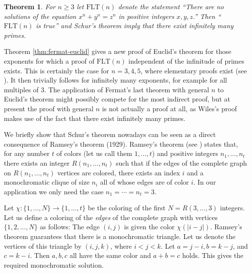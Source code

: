 \documentclass{article}
\theoremstyle{theorem}
\newtheorem{theorem}{Theorem}
\theoremstyle{definition}
\newcommand{\FLT}{\mathrm{FLT}}
\begin{document}
\begin{theorem}{\label{thm:fermat-euclid}}
For $n \geq 3$ let $\FLT(n)$ denote the statement
``There are no solutions of the equation 
$x^n+y^n=z^n$ in positive integers $x,y,z$.''
Then ``$\FLT(n)$ is true'' and Schur's theorem imply that
there exist infinitely many primes.
\end{theorem}
Theorem \ref{thm:fermat-euclid} 
gives a new proof of Euclid's theorem for those exponents
for which a proof of $\FLT(n)$ independent of the infinitude of
primes exists.
This is certainly the case for $n=3,4,5$, 
where elementary proofs exist (see 
\cite{Edwards, Ribenboim-Fermatbook}).
It then trivially follows for
infinitely many exponents, for example for all multiples of $3$.
 The application
of Fermat's last theorem with general $n$ to Euclid's theorem
might possibly compete for the most indirect proof, 
but at present the proof with
general $n$ is not
actually a proof at all,
as Wiles's proof makes use of the fact that there exist infinitely many primes.

We briefly show that Schur's theorem nowadays can be seen as a 
direct consequence of Ramsey's theorem \cite{Ramsey} (1929).
Ramsey's theorem (see \cite[Theorem 10.3.1]{Cameron}) states that, 
for any number $t$ of colors (let us call them $1, \ldots , t$)
and positive integers $n_1, \ldots, n_t$
there exists an integer $R(n_1, \ldots, n_t)$ such that if the edges of the
complete graph on $R(n_1, \ldots, n_t)$ vertices are colored, there exists
an index $i$ and a monochromatic clique of size $n_i$ all of whose edges are of 
color $i$.
In our application we only need the case $n_1=\cdots =n_t=3$.
 

Let $\chi: \{1,\ldots, N\} \rightarrow \{1, \ldots , t\}$ be the coloring of the first 
$N=R(3, \ldots, 3)$ integers. Let us define a coloring
of the \emph{edges} of the complete graph with vertices 
$\{1, 2, \ldots, N\}$ as follows:
The edge  $(i, j)$ is given the color $\chi(|i-j|)$. Ramsey's
theorem guarantees that there is a monochromatic triangle. 
Let us denote  the vertices of this
triangle by $(i,j,k)$, where $i < j <k$.
Let $a = j - i, b = k - j$, and $c = k - i$.
Then $a,b,c$ all have the same color and $a+b=c$ holds.
This gives the required monochromatic solution.
\end{document}

